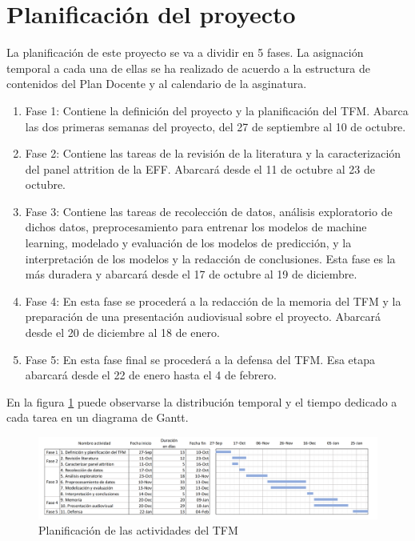 \section{Planificación del proyecto}

La planificación de este proyecto se va a dividir en 5 fases. La asignación temporal a cada una de ellas se ha realizado de acuerdo a la estructura de contenidos del Plan Docente y al calendario de la asginatura.

\begin{enumerate}[noitemsep]
    \item Fase 1: Contiene la definición del proyecto y la planificación del TFM. Abarca las dos primeras semanas del proyecto, del 27 de septiembre al 10 de octubre.
    \item Fase 2: Contiene las tareas de la revisión de la literatura y la caracterización del panel attrition de la EFF. Abarcará desde el 11 de octubre al 23 de octubre.
    \item Fase 3: Contiene las tareas de recolección de datos, análisis exploratorio de dichos datos, preprocesamiento para entrenar los modelos de machine learning, modelado y evaluación de los modelos de predicción, y la interpretación de los modelos y la redacción de conclusiones. Esta fase es la más duradera y abarcará desde el 17 de octubre al 19 de diciembre.
    \item Fase 4: En esta fase se procederá a la redacción de la memoria del TFM y la preparación de una presentación audiovisual sobre el proyecto. Abarcará desde el 20 de diciembre al 18 de enero.
    \item Fase 5: En esta fase final se procederá a la defensa del TFM. Esa etapa abarcará desde el 22 de enero hasta el 4 de febrero.
\end{enumerate}

 En la figura \ref{fig:gantt} puede observarse la distribución temporal y el tiempo dedicado a cada tarea en un diagrama de Gantt.


\begin{figure}
	\centering
	\includegraphics[width=1\textwidth]{figs/Gantt_diagram.png}
	\caption{Planificación de las actividades del TFM}
	\label{fig:gantt}
\end{figure}

